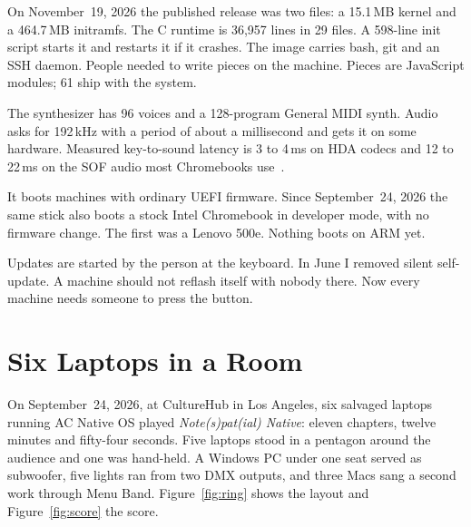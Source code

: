 \documentclass[10pt,letterpaper,twocolumn]{article}
\newcommand{\acos}{AC Native OS}
\begin{document}
On November~19, 2026 the published release was two files: a 15.1\,MB kernel and a 464.7\,MB initramfs. The C runtime is 36,957 lines in 29 files. A 598-line init script starts it and restarts it if it crashes. The image carries bash, git and an SSH daemon. People needed to write pieces on the machine. Pieces are JavaScript modules; 61 ship with the system.

The synthesizer has 96 voices and a 128-program General MIDI synth. Audio asks for 192\,kHz with a period of about a millisecond and gets it on some hardware. Measured key-to-sound latency is 3 to 4\,ms on HDA codecs and 12 to 22\,ms on the SOF audio most Chromebooks use~\citep{scudder2026latency}.

It boots machines with ordinary UEFI firmware. Since September~24, 2026 the same stick also boots a stock Intel Chromebook in developer mode, with no firmware change. The first was a Lenovo 500e. Nothing boots on ARM yet.

Updates are started by the person at the keyboard. In June I removed silent self-update. A machine should not reflash itself with nobody there. Now every machine needs someone to press the button.


\section{Six Laptops in a Room}
\label{sec:culturehub}

On September~24, 2026, at CultureHub in Los Angeles, six salvaged laptops running \acos{} played \emph{Note(s)pat(ial) Native}: eleven chapters, twelve minutes and fifty-four seconds. Five laptops stood in a pentagon around the audience and one was hand-held. A Windows PC under one seat served as subwoofer, five lights ran from two DMX outputs, and three Macs sang a second work through Menu Band. Figure~\ref{fig:ring} shows the layout and Figure~\ref{fig:score} the score.
\end{document}
